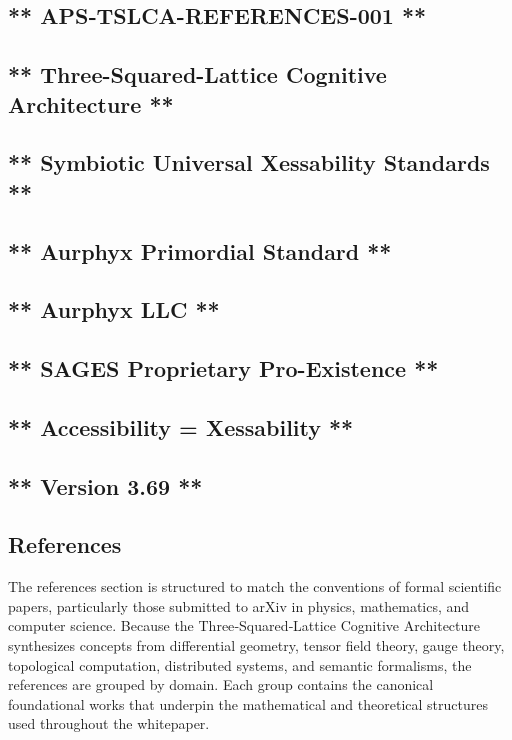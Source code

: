 \subsection{** APS‑TSLCA-REFERENCES-001 **}\label{apstslca-references-001}

\subsection{** Three-Squared-Lattice Cognitive Architecture **}\label{three-squared-lattice-cognitive-architecture}

\subsection{** Symbiotic Universal Xessability Standards **}\label{symbiotic-universal-xessability-standards}

\subsection{** Aurphyx Primordial Standard **}\label{aurphyx-primordial-standard}

\subsection{** Aurphyx LLC **}\label{aurphyx-llc}

\subsection{** SAGES \textbar{} Proprietary \textbar{} Pro-Existence **}\label{sages-proprietary-pro-existence}

\subsection{** Accessibility = Xessability **}\label{accessibility-xessability}

\subsection{** Version 3.69 **}\label{version-3.69}

\subsection{References}\label{references}

The references section is structured to match the conventions of formal scientific papers, particularly those submitted to arXiv in physics, mathematics, and computer science. Because the Three‑Squared‑Lattice Cognitive Architecture synthesizes concepts from differential geometry, tensor field theory, gauge theory, topological computation, distributed systems, and semantic formalisms, the references are grouped by domain. Each group contains the canonical foundational works that underpin the mathematical and theoretical structures used throughout the whitepaper.

